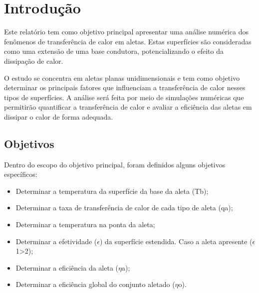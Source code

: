 {\let\clearpage\relax\chapter{Introdução}\label{cap:definitions}}

\vspace{-1.5cm}Este relatório tem como objetivo principal apresentar uma análise numérica dos fenômenos de transferência de calor em aletas. Estas superfícies são consideradas como uma extensão de uma base condutora, potencializando o efeito da dissipação de calor.

O estudo se concentra em aletas planas unidimensionais e tem como objetivo determinar os principais fatores que influenciam a transferência de calor nesses tipos de superfícies. A análise será feita por meio de simulações numéricas que permitirão quantificar a transferência de calor e avaliar a eficiência das aletas em dissipar o calor de forma adequada.

\section{Objetivos}

Dentro do escopo do objetivo principal, foram definidos alguns objetivos específicos:

\vspace{-1cm}\begin{itemize}[leftmargin=2cm]
   \item Determinar a temperatura da superfície da base da aleta (Tb);

   \item Determinar a taxa de transferência de calor de cada tipo de aleta (qa);

   \item Determinar a temperatura na ponta da aleta;

   \item Determinar a efetividade ({\large \(\epsilon\)}) da superfície estendida. Caso a aleta apresente ({\large\(\epsilon\)}1>2);

   \item Determinar a eficiência da aleta ({\large\(\eta\)}a);

   \item Determinar a eficiência global do conjunto aletado ({\large\({\eta}\)}o).
\end{itemize}
